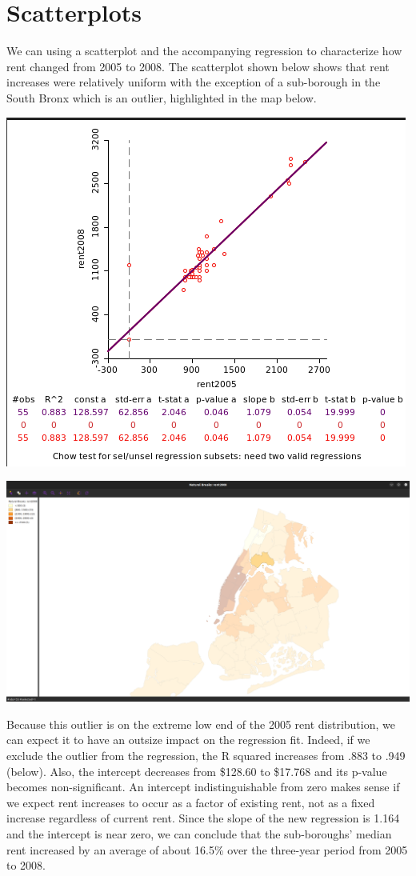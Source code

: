 \documentclass[11pt]{article}
\begin{document}
\section{Scatterplots}
\label{sec:orgf16dc82}
We can using a scatterplot and the accompanying regression to characterize how rent changed from 2005 to 2008. The scatterplot shown below shows that rent increases were relatively uniform with the exception of a sub-borough in the South Bronx which is an outlier, highlighted in the map below.

\begin{center}
\includegraphics[width=.9\linewidth]{scatter.png}
\end{center}
\begin{center}
\includegraphics[width=.9\linewidth]{outlier.png}
\end{center}

Because this outlier is on the extreme low end of the 2005 rent
distribution, we can expect it to have an outsize impact on the
regression fit. Indeed, if we exclude the outlier from the regression,
the R squared increases from .883 to .949 (below). Also, the intercept
decreases from \$128.60 to \$17.768 and its p-value becomes
non-significant. An intercept indistinguishable from zero makes sense
if we expect rent increases to occur as a factor of existing rent, not
as a fixed increase regardless of current rent. Since the slope of the
new regression is 1.164 and the intercept is near zero, we can
conclude that the sub-boroughs' median rent increased by an average of
about 16.5\% over the three-year period from 2005 to 2008.
\end{document}
